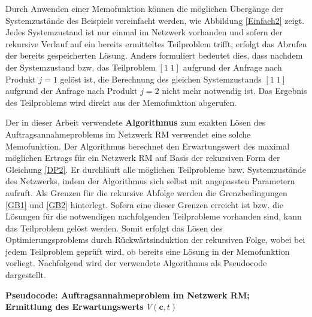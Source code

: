 Durch Anwenden einer Memofunktion können die möglichen Übergänge der Systemzustände des Beispiels vereinfacht werden, wie Abbildung \ref{Einfach2} zeigt. Jedes Systemzustand ist nur einmal im Netzwerk vorhanden und sofern der rekursive Verlauf auf ein bereits ermitteltes Teilproblem trifft, erfolgt das Abrufen der bereits gespeicherten Lösung. Anders formuliert bedeutet dies, dass nachdem der Systemzustand bzw. das Teilproblem $[1\; 1]$ aufgrund der Anfrage nach Produkt $j=1$ gelöst ist, die Berechnung des gleichen Systemzustands $[1\; 1]$ aufgrund der Anfrage nach Produkt $j=2$ nicht mehr notwendig ist. Das Ergebnis des Teilproblems wird direkt aus der Memofunktion abgerufen.

Der in dieser Arbeit verwendete \textbf{Algorithmus} zum exakten Lösen des Auftragsannahmeproblems im Netzwerk RM verwendet eine solche Memofunktion. Der Algorithmus berechnet den Erwartungswert des maximal möglichen Ertrags für ein Netzwerk RM auf Basis der rekursiven Form der Gleichung \eqref{DP2}. Er durchläuft alle möglichen Teilprobleme bzw. Systemzustände des Netzwerks, indem der Algorithmus sich selbst mit angepassten Parametern aufruft. Als Grenzen für die rekursive Abfolge werden die Grenzbedingungen \eqref{GB1} und \eqref{GB2} hinterlegt. Sofern eine dieser Grenzen erreicht ist bzw. die Lösungen für die notwendigen nachfolgenden Teilprobleme vorhanden sind, kann das Teilproblem gelöst werden. Somit erfolgt das Lösen des Optimierungsproblems durch Rückwärtsinduktion der rekursiven Folge, wobei bei jedem Teilproblem geprüft wird, ob bereits eine Lösung in der Memofunktion vorliegt. Nachfolgend wird der verwendete Algorithmus als Pseudocode dargestellt.

\begin{algorithm}[H]
\textbf{Pseudocode: Auftragsannahmeproblem im Netzwerk RM;\\ 
Ermittlung des Erwartungswerts $V(\textbf{c},t)$}\\
\end{algorithm}

